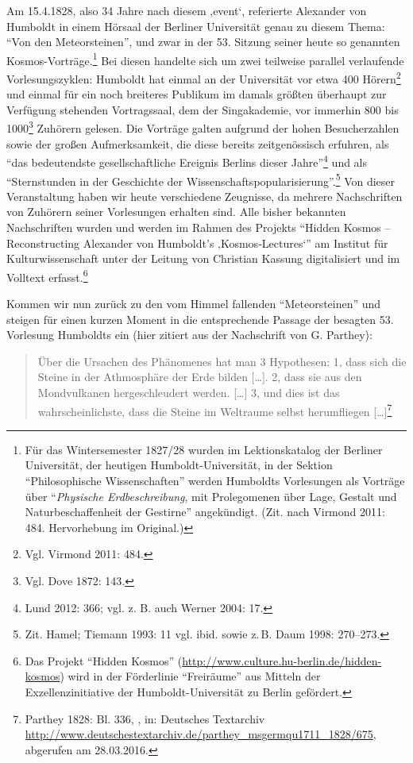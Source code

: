 \documentclass[output=paper]{langsci/langscibook}
\begin{document}
Am 15.4.1828, also 34 Jahre nach diesem ‚event`, referierte Alexander
von Humboldt in einem Hörsaal der Berliner Universität genau zu diesem
Thema: \enquote{Von den Meteorsteinen}, und zwar in der 53. Sitzung
seiner heute so genannten Kos\-mos-Vorträge.\footnote{Für das
  Wintersemester 1827/28 wurden im Lektionskatalog der Berliner
  Universität, der heutigen Humboldt-Universität, in der Sektion
  \enquote{Philosophische Wissenschaften} werden Humboldts Vorlesungen
  als Vorträge über \enquote{\emph{Physische Erdbeschreibung}, mit
  Prolegomenen über Lage, Gestalt und Naturbeschaffenheit der Gestirne}
  angekündigt. (Zit. nach Virmond 2011: 484. Hervorhebung im Original.)}
Bei diesen handelte sich um zwei teilweise parallel verlaufende
Vorlesungszyklen: Humboldt hat einmal an der Universität vor etwa 400
Hörern\footnote{Vgl. Virmond 2011: 484.} und einmal für ein noch
breiteres Publikum im damals größten überhaupt zur Verfügung stehenden
Vortragssaal, dem der Singakademie, vor immerhin 800 bis 1000\footnote{Vgl.
  Dove 1872: 143.} Zuhörern gelesen. Die Vorträge galten aufgrund der
hohen Besucherzahlen sowie der großen Aufmerksamkeit, die diese bereits
zeitgenössisch erfuhren, als \enquote{das bedeutendste gesellschaftliche
Ereignis Berlins dieser Jahre}\footnote{Lund 2012: 366; vgl. z. B. auch
  Werner 2004: 17.} und als \enquote{Sternstunden in der Geschichte der
Wissenschaftspopularisierung}.\footnote{Zit. Hamel; Tiemann 1993: 11
  vgl. ibid. sowie z.\,B. Daum 1998: 270--273.} Von dieser Veranstaltung
haben wir heute verschiedene Zeugnisse, da mehrere Nachschriften von
Zuhörern seiner Vorlesungen erhalten sind. Alle bisher bekannten
Nachschriften wurden und werden im Rahmen des Projekts \enquote{Hidden
Kosmos -- Reconstructing Alexander von Humboldt's ‚Kosmos-Lectures`} am
Institut für Kulturwissenschaft unter der Leitung von Christian Kassung
digitalisiert und im Volltext erfasst.\footnote{Das Projekt
  \enquote{Hidden Kosmos}
  (\url{http://www.culture.hu-berlin.de/hidden-kosmos}) wird in der
  Förderlinie \enquote{Freiräume} aus Mitteln der Exzellenzinitiative
  der Humboldt-Universität zu Berlin gefördert.}

Kommen wir nun zurück zu den vom Himmel fallenden
\enquote{Meteorsteinen} und steigen für einen kurzen Moment in die
entsprechende Passage der besagten 53. Vorlesung Humboldts ein (hier
zitiert aus der Nachschrift von G. Parthey):

\begin{quote}
Über die Ursachen des Phänomenes hat man 3 Hypothesen: 1, dass sich die
Steine in der Athmosphäre der Erde bilden {[}\ldots{}{]}. 2, dass sie
aus den Mondvulkanen hergeschleudert werden. {[}\ldots{}{]} 3, und dies
ist das wahrscheinlichste, dass die Steine im Weltraume selbst
herumfliegen {[}\ldots{}{]}\footnote{Parthey 1828: Bl. 336, , in:
  Deutsches Textarchiv
  \url{http://www.deutschestextarchiv.de/parthey_msgermqu1711_1828/675},
  abgerufen am 28.03.2016.}
\end{quote}
\end{document}
